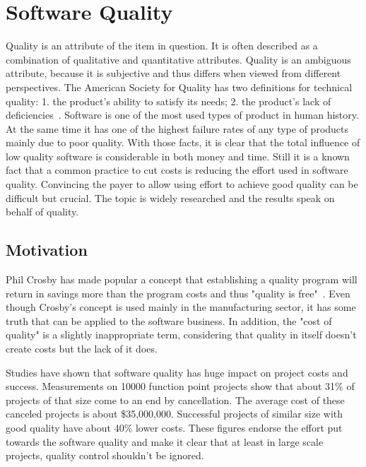 \section{Software Quality}
\label{sec:software_quality}

Quality is an attribute of the item in question. It is often described as a combination of qualitative and quantitative attributes. Quality is an ambiguous attribute, because it is subjective and thus differs when viewed from different perspectives. The American Society for Quality has two definitions for technical quality: 1. the product's ability to satisfy its needs; 2. the product's lack of deficiencies~\cite{ASQglossary}. Software is one of the most used types of product in human history. At the same time it has one of the highest failure rates of any type of products mainly due to poor quality. With those facts, it is clear that the total influence of low quality software is considerable in both money and time. Still it is a known fact that a common practice to cut costs is reducing the effort used in software quality. Convincing the payer to allow using effort to achieve good quality can be difficult but crucial. The topic is widely researched and the results speak on behalf of quality.~\cite{jones2011economics}


\subsection{Motivation}

Phil Crosby has made popular a concept that establishing a quality program will return in savings more than the program costs and thus "quality is free"~\cite{crosby1980quality}. Even though Crosby's concept is used mainly in the manufacturing sector, it has some truth that can be applied to the software business.  In addition, the "cost of quality" is a slightly inappropriate term, considering that quality in itself doesn't create costs but the lack of it does.

Studies have shown that software quality has huge impact on project costs and success. Measurements on 10000 function point projects show that about 31\% of projects of that size come to an end by cancellation. The average cost of these canceled projects is about \$35,000,000. Successful projects of similar size with good quality have about 40\% lower costs. These figures endorse the effort put towards the software quality and make it clear that at least in large scale projects, quality control shouldn't be ignored.~\cite{jones2011economics}

